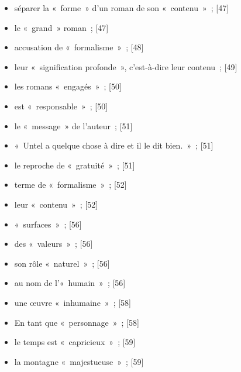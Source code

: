 \documentclass[12pt, a4paper]{article}
\begin{document}
\begin{itemize}
    \item séparer la «~forme~» d’un roman de son «~contenu~»{\color{gray}~; [47]}

    \item le «~grand~» roman{\color{gray}~; [47]}

    \item accusation de «~formalisme~»{\color{gray}~; [48]}

    \item leur «~signification profonde~», c’est-à-dire leur contenu{\color{gray}~; [49]}

    \item les romans «~engagés~»{\color{gray}~; [50]}

    \item est «~responsable~»{\color{gray}~; [50]}

    \item le «~message~» de l’auteur{\color{gray}~; [51]}

    \item «~Untel a quelque chose à dire et il le dit bien.~»{\color{gray}~; [51]}

    \item le reproche de «~gratuité~»{\color{gray}~; [51]}

    \item terme de «~formalisme~»{\color{gray}~; [52]}

    \item leur «~contenu~»{\color{gray}~; [52]}

    \item «~surfaces~»{\color{gray}~; [56]}

    \item des «~valeurs~»{\color{gray}~; [56]}

    \item son rôle «~naturel~»{\color{gray}~; [56]}

    \item au nom de l’«~humain~»{\color{gray}~; [56]}

    \item une œuvre «~inhumaine~»{\color{gray}~; [58]}

    \item En tant que «~personnage~»{\color{gray}~; [58]}

    \item le temps est «~capricieux~»{\color{gray}~; [59]}

    \item la montagne «~majestueuse~»{\color{gray}~; [59]}


\end{itemize}
\end{document}
